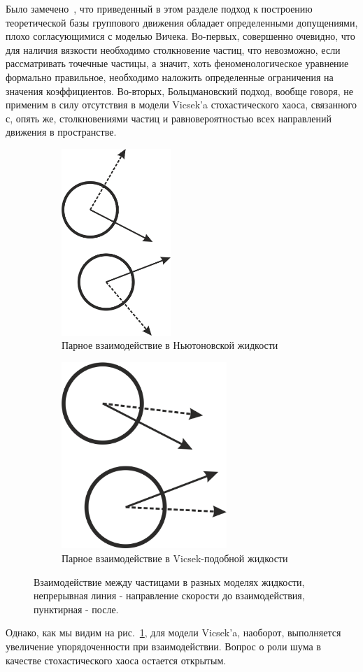 	Было замечено~\cite{kulinskii2009,chepizhko2013}, что приведенный в этом разделе подход к построению теоретической базы группового движения обладает определенными допущениями, плохо согласующимися с моделью Вичека. Во-первых, совершенно очевидно, что для наличия вязкости необходимо столкновение частиц, что невозможно, если рассматривать точечные частицы, а значит, хоть феноменологическое уравнение формально правильное, необходимо наложить определенные ограничения на значения коэффициентов. Во-вторых, Больцмановский подход, вообще говоря, не применим в силу отсутствия в модели Vicsek'a стохастического хаоса, связанного с, опять же, столкновениями частиц и равновероятностью всех направлений движения в пространстве.
	\begin{figure}[h]
	\centering
        \begin{subfigure}{0.45\textwidth}
                \includegraphics[height=200pt]{Images/NewtonInterractions}
                \caption{Парное взаимодействие в Ньютоновской жидкости}
        \end{subfigure}
        \begin{subfigure}{0.45\textwidth}
                \includegraphics[height=200pt]{Images/VicsekInterrcations}
                \caption{Парное взаимодействие в Vicsek-подобной жидкости}
        \end{subfigure}
        \caption{Взаимодействие между частицами в разных моделях жидкости, непрерывная линия - направление скорости до взаимодействия, пунктирная - после.}
        \label{fig:PairParticleInterractions}
	\end{figure}

	Однако, как мы видим на рис.~\ref{fig:PairParticleInterractions}, для модели Vicsek'a, наоборот, выполняется увеличение упорядоченности при взаимодействии. Вопрос о роли шума в качестве стохастического хаоса остается открытым.
